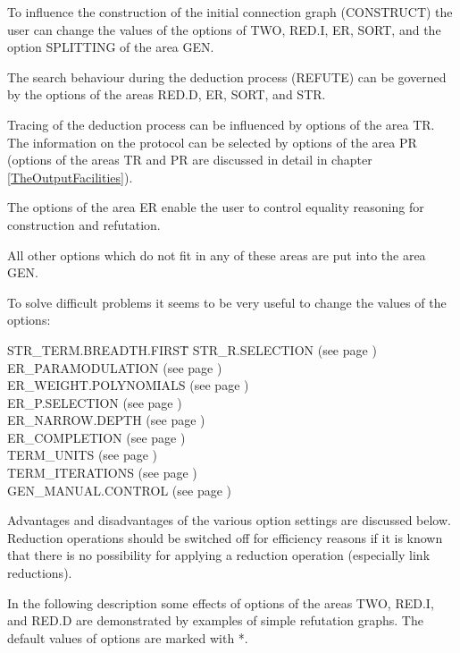 To influence the construction of the initial connection graph (CONSTRUCT) 
the user can change the values of the options of TWO, RED.I, ER, SORT, and the option 
SPLITTING of the area GEN.

The search behaviour during the deduction process (REFUTE) can be 
governed by the options of the areas RED.D, ER, SORT, and STR. 

Tracing of the deduction process can be influenced by options of the area 
TR. The information on the protocol can be selected by options of the area 
PR (options of the areas TR and PR are discussed in detail in chapter \ref{TheOutputFacilities}).

The options of the area ER enable the user to control equality reasoning
for construction and refutation.

All other options which do not fit in any of these areas are put into the 
area GEN.

To solve difficult problems it seems to be very useful to change the values 
of the options:

\begin{tabbing}
STR\_TERM.BREADTH.FIRST\quad \=\kill
        STR\_R.SELECTION \> (see page \pageref{strrselection})\\
	ER\_PARAMODULATION \> (see page \pageref{erparamodulation})\\
        ER\_WEIGHT.POLYNOMIALS \> (see page \pageref{erweightpolynomials})\\
        ER\_P.SELECTION \> (see page \pageref{erpselection})\\
	ER\_NARROW.DEPTH  \> (see page \pageref{ernarrowdepth})\\
	ER\_COMPLETION  \> (see page \pageref{ercompletion})\\
	TERM\_UNITS  \> (see page \pageref{termunits})\\
 	TERM\_ITERATIONS  \> (see page \pageref{termiterations})\\
        GEN\_MANUAL.CONTROL \> (see page \pageref{genmanualcontrol})
\end{tabbing}

Advantages and disadvantages of the various option settings are discussed 
below. Reduction operations should be switched off for efficiency reasons 
if it is known that there is no possibility for applying a reduction 
operation (especially link reductions).

In the following description some effects of options of the areas TWO, 
RED.I, and RED.D are demonstrated by examples of simple refutation graphs. 
The default values of options are marked with *.


